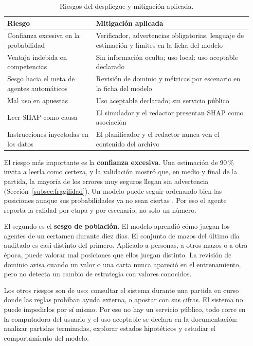 \begin{table}[!t]
\centering
\caption{Riesgos del despliegue y mitigación aplicada.}
\label{tab:riesgosdespliegue}
\footnotesize
\begin{tabularx}{\columnwidth}{@{}P{2.3cm} Y@{}}
\toprule
\textbf{Riesgo} & \textbf{Mitigación aplicada}\\
\midrule
Confianza excesiva en la probabilidad & Verificador, advertencias
obligatorias, lenguaje de estimación y límites en la ficha del modelo\\
Ventaja indebida en competencias & Sin información oculta; uso local; uso
aceptable declarado\\
Sesgo hacia el meta de agentes automáticos & Revisión de dominio y
métricas por escenario en la ficha del modelo\\
Mal uso en apuestas & Uso aceptable declarado; sin servicio público\\
Leer SHAP como causa & El simulador y el redactor presentan SHAP como
asociación\\
Instrucciones inyectadas en los datos & El planificador y el redactor
nunca ven el contenido del archivo\\
\bottomrule
\end{tabularx}
\end{table}

El riesgo más importante es la \textbf{confianza excesiva}. Una estimación
de 90\,\% invita a leerla como certeza, y la validación mostró que, en
medio y final de la partida, la mayoría de los errores muy seguros llegan
sin advertencia (Sección~\ref{subsec:fragilidad}). Un modelo puede seguir
ordenando bien las posiciones aunque sus probabilidades ya no sean
ciertas \cite{guo_temporalshift_2021}. Por eso el agente reporta la
calidad por etapa y por escenario, no solo un número.

El segundo es el \textbf{sesgo de población}. El modelo aprendió cómo juegan
los agentes de un certamen durante diez días. El conjunto de mazos del
último día auditado es casi distinto del primero. Aplicado a personas, a
otros mazos o a otra época, puede valorar mal posiciones que ellos juegan
distinto. La revisión de dominio avisa cuando un valor o una carta nunca
apareció en el entrenamiento, pero no detecta un cambio de estrategia con
valores conocidos.

Los otros riesgos son de uso: consultar el sistema durante una partida en
curso donde las reglas prohíban ayuda externa, o apostar con sus cifras.
El sistema no puede impedirlos por sí mismo. Por eso no hay un servicio
público, todo corre en la computadora del usuario y el uso aceptable se
declara en la documentación: analizar partidas terminadas, explorar
estados hipotéticos y estudiar el comportamiento del modelo.

